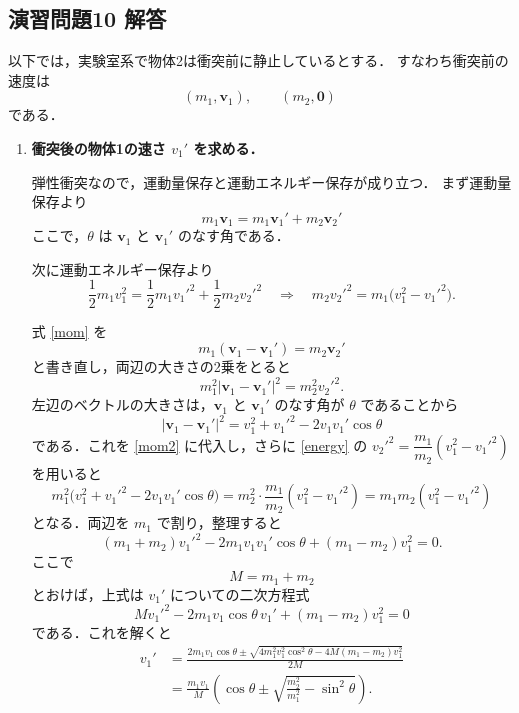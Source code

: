 \documentclass[a4paper,12pt]{jlreq}
\begin{document}
\subsection*{演習問題10 解答}

以下では，実験室系で物体2は衝突前に静止しているとする．
すなわち衝突前の速度は
\[
(m_1,\mathbf{v}_1),\qquad (m_2,\mathbf{0})
\]
である．

\begin{enumerate}
  \item \textbf{衝突後の物体1の速さ $v_1'$ を求める．}

  弾性衝突なので，運動量保存と運動エネルギー保存が成り立つ．
  まず運動量保存より
  \begin{equation}
    m_1\mathbf{v}_1 = m_1\mathbf{v}_1' + m_2\mathbf{v}_2'
    \label{mom}
  \end{equation}
  ここで，$\theta$ は $\mathbf{v}_1$ と $\mathbf{v}_1'$ のなす角である．

  次に運動エネルギー保存より
  \begin{equation}
    \frac12 m_1 v_1^2
    = \frac12 m_1 v_1'^2 + \frac12 m_2 v_2'^2
    \quad\Longrightarrow\quad
    m_2 v_2'^2 = m_1\bigl(v_1^2 - v_1'^2\bigr).
    \label{energy}
  \end{equation}

  式 \eqref{mom} を
  \[
    m_1(\mathbf{v}_1 - \mathbf{v}_1') = m_2\mathbf{v}_2'
  \]
  と書き直し，両辺の大きさの2乗をとると
  \begin{equation}
    m_1^2 \bigl|\mathbf{v}_1 - \mathbf{v}_1'\bigr|^2
      = m_2^2 v_2'^2.
    \label{mom2}
  \end{equation}
  左辺のベクトルの大きさは，$\mathbf{v}_1$ と $\mathbf{v}_1'$ のなす角が $\theta$ であることから
  \[
    \bigl|\mathbf{v}_1 - \mathbf{v}_1'\bigr|^2
      = v_1^2 + v_1'^2 - 2 v_1 v_1' \cos\theta
  \]
  である．これを \eqref{mom2} に代入し，さらに \eqref{energy} の
  $v_2'^2 = \dfrac{m_1}{m_2}(v_1^2 - v_1'^2)$
  を用いると
  \[
    m_1^2\bigl(v_1^2 + v_1'^2 - 2 v_1 v_1' \cos\theta\bigr)
      = m_2^2 \cdot \frac{m_1}{m_2}(v_1^2 - v_1'^2)
      = m_1 m_2 (v_1^2 - v_1'^2)
  \]
  となる．両辺を $m_1$ で割り，整理すると
  \[
    (m_1+m_2)v_1'^2 - 2 m_1 v_1 v_1' \cos\theta
      + (m_1 - m_2)v_1^2 = 0.
  \]
  ここで
  \[
    M = m_1 + m_2
  \]
  とおけば，上式は $v_1'$ についての二次方程式
  \[
    M v_1'^2 - 2 m_1 v_1 \cos\theta\, v_1'
      + (m_1 - m_2)v_1^2 = 0
  \]
  である．これを解くと
  \begin{align*}
    v_1'
    &= \frac{2 m_1 v_1 \cos\theta
      \pm \sqrt{4 m_1^2 v_1^2 \cos^2\theta
      - 4 M (m_1 - m_2) v_1^2}}{2M} \\[2mm]
    &= \frac{m_1 v_1}{M}
        \left(
          \cos\theta
          \pm \sqrt{\frac{m_2^2}{m_1^2} - \sin^2\theta}
        \right).
  \end{align*}


\end{enumerate}
\end{document}

